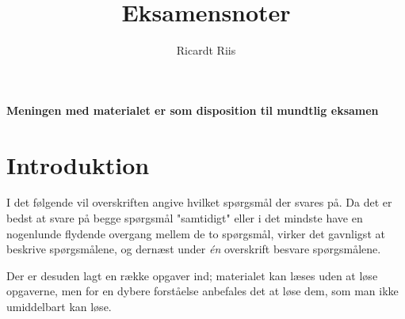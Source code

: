 \documentclass{article}
\title{Eksamensnoter}
\author{Ricardt Riis}
\begin{document}
\maketitle

\textbf{Meningen med materialet er som disposition til mundtlig eksamen}

\tableofcontents

\section*{Introduktion}
I det følgende vil overskriften angive hvilket spørgsmål der svares på. Da det
er bedst at svare på begge spørgsmål "samtidigt" eller i det mindste have en
nogenlunde flydende overgang mellem de to spørgsmål, virker det gavnligst at
beskrive spørgsmålene, og dernæst under \emph{én} overskrift besvare
spørgsmålene.

Der er desuden lagt en række opgaver ind; materialet kan læses uden at løse
opgaverne, men for en dybere forståelse anbefales det at løse dem, som man ikke
umiddelbart kan løse.
\end{document}
